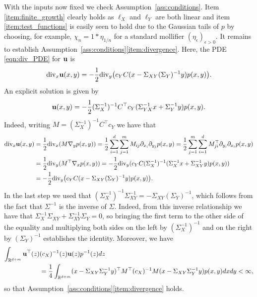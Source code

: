 \documentclass{article}
\theoremstyle{plain}
\theoremstyle{definition}
\newcommand{\R}{\mathbb{R}}
\numberwithin{lem}{section}
\begin{document}
With the inputs now fixed we check Assumption~\ref{ass:conditions}. Item \ref{item:finite_growth} clearly holds as $\ell_X$ and $\ell_Y$ are both linear and item \ref{item:test_functions} is easily seen to hold due to the Gaussian tails of $p$ by choosing, for example, $\chi_n = 1*\eta_{1/n}$ for a standard mollifier $(\eta_\epsilon)_{\epsilon > 0}$. It remains to establish Assumption~\ref{ass:conditions}\ref{item:divergence}. Here, the PDE \eqref{eqn:div_PDE} for ${\bf u}$ is 
 \begin{equation} \label{eqn:u_Gaussian}
 \mathrm{div}_x {\bf u}(x,y) = -\frac{1}{2}\mathrm{div}_y\big(c_YC(x-\Sigma_{XY}(\Sigma_Y)^{-1}y)p(x,y)\big).
 \end{equation}
An explicit solution is given by
\[ {\bf u}(x,y) = - \frac{1}{2}(\Sigma_X^{-1})^{-1}C^\top c_Y(\Sigma_{YX}^{-1}x + \Sigma_Y^{-1}y)p(x,y).\]
Indeed, writing $M = (\Sigma_X^{-1})^{-1}C^\top c_Y$ we have that
\begin{align}
\mathrm{div}_x {\bf u}(x,y) & = \frac{1}{2}\mathrm{div}_x(M\nabla_y p(x,y)) = \frac{1}{2} \sum_{i=1}^d\sum_{j=1}^m M_{ij}\partial_{x_i}\partial_{y_j}p(x,y)=  \frac{1}{2} \sum_{j=1}^m\sum_{i=1}^d M^\top_{ji}\partial_{y_i}\partial_{x_i}p(x,y) \\
& = \frac{1}{2}\mathrm{div}_y(M^\top \nabla_x p(x,y)) = -\frac{1}{2}\mathrm{div}_y(c_YC(\Sigma_X^{-1})^{-1}(\Sigma^{-1}_X x + \Sigma^{-1}_{XY}y)p(x,y)) \label{eqn:u_verification_Gaussian} \\
& = -\frac{1}{2}\mathrm{div}_y\big(c_YC(x-\Sigma_{XY}(\Sigma_Y)^{-1}y)p(x,y)\big).
\end{align}
In the last step we used that $(\Sigma_X^{-1})^{-1}\Sigma^{-1}_{XY} = -\Sigma_{XY}(\Sigma_Y)^{-1}$, which follows from the fact that $\Sigma^{-1}$ is the inverse of $\Sigma$. Indeed, from this inverse relationship we have that $\Sigma^{-1}_X\Sigma_{XY} + \Sigma^{-1}_{XY}\Sigma_Y = 0$, so bringing the first term to the other side of the equality and multiplying both sides on the left by $(\Sigma_X^{-1})^{-1}$ and on the right by $(\Sigma_Y)^{-1}$ establishes the identity. Moreover, we have
\begin{align}
    \int_{\R^{d+m}} {\bf u}^\top(z) & (c_X)^{-1}(z)  {\bf u}(z) p^{-1}(z)dz \\
    & = \frac{1}{4}\int_{\R^{d+m}} (x-\Sigma_{XY}\Sigma_Y^{-1}y)^\top M^\top (c_X)^{-1}M(x-\Sigma_{XY}\Sigma_Y^{-1}y)p(x,y)dxdy < \infty,
\end{align}
so that Assumption~\ref{ass:conditions}\ref{item:divergence} holds. 
\end{document}
